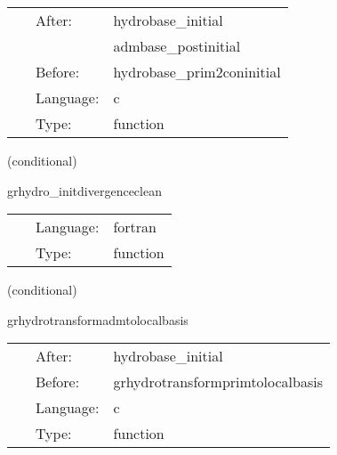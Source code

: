 \hspace{5mm}

 \begin{tabular*}{160mm}{cll} 
~ & After:  & hydrobase\_initial \\ 
~& ~ &admbase\_postinitial\\ 
~ & Before:  & hydrobase\_prim2coninitial \\ 
~ & Language:  & c \\ 
~ & Type:  & function \\ 
\end{tabular*} 


\vspace{5mm}

   (conditional) 

\hspace{5mm} grhydro\_initdivergenceclean 

\hspace{5mm}{\it set psi for divergence cleaning initially to zero } 


\hspace{5mm}

 \begin{tabular*}{160mm}{cll} 
~ & Language:  & fortran \\ 
~ & Type:  & function \\ 
\end{tabular*} 


\vspace{5mm}

   (conditional) 

\hspace{5mm} grhydrotransformadmtolocalbasis 

\hspace{5mm}{\it transform adm metric, extr. curv. and shift to local tensor basis. } 


\hspace{5mm}

 \begin{tabular*}{160mm}{cll} 
~ & After:  & hydrobase\_initial \\ 
~ & Before:  & grhydrotransformprimtolocalbasis \\ 
~ & Language:  & c \\ 
~ & Type:  & function \\ 
\end{tabular*} 


\vspace{5mm}

